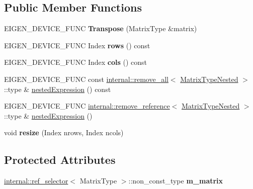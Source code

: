 \subsection*{Public Member Functions}
\begin{DoxyCompactItemize}
\item 
\mbox{\label{class_eigen_1_1_transpose_a5469f683c4bbcce2a40a2b43dad8a465}} 
E\+I\+G\+E\+N\+\_\+\+D\+E\+V\+I\+C\+E\+\_\+\+F\+U\+NC {\bfseries Transpose} (Matrix\+Type \&matrix)
\item 
\mbox{\label{class_eigen_1_1_transpose_a96ee3f0ac8d9d95671e5dda0e5e21356}} 
E\+I\+G\+E\+N\+\_\+\+D\+E\+V\+I\+C\+E\+\_\+\+F\+U\+NC Index {\bfseries rows} () const
\item 
\mbox{\label{class_eigen_1_1_transpose_a809b0d34821ca6ade698561f3495adca}} 
E\+I\+G\+E\+N\+\_\+\+D\+E\+V\+I\+C\+E\+\_\+\+F\+U\+NC Index {\bfseries cols} () const
\item 
E\+I\+G\+E\+N\+\_\+\+D\+E\+V\+I\+C\+E\+\_\+\+F\+U\+NC const \mbox{\hyperlink{struct_eigen_1_1internal_1_1remove__all}{internal\+::remove\+\_\+all}}$<$ \mbox{\hyperlink{struct_eigen_1_1internal_1_1true__type}{Matrix\+Type\+Nested}} $>$\+::type \& \mbox{\hyperlink{class_eigen_1_1_transpose_a72aefbf67f5e3caf62a99f73409b4a63}{nested\+Expression}} () const
\item 
E\+I\+G\+E\+N\+\_\+\+D\+E\+V\+I\+C\+E\+\_\+\+F\+U\+NC \mbox{\hyperlink{struct_eigen_1_1internal_1_1remove__reference}{internal\+::remove\+\_\+reference}}$<$ \mbox{\hyperlink{struct_eigen_1_1internal_1_1true__type}{Matrix\+Type\+Nested}} $>$\+::type \& \mbox{\hyperlink{class_eigen_1_1_transpose_a3265292cf912f401a32eea99975e47ea}{nested\+Expression}} ()
\item 
\mbox{\label{class_eigen_1_1_transpose_acdfe991ea04dd20939171780fef09818}} 
void {\bfseries resize} (Index nrows, Index ncols)
\end{DoxyCompactItemize}
\subsection*{Protected Attributes}
\begin{DoxyCompactItemize}
\item 
\mbox{\label{class_eigen_1_1_transpose_ad67b9a99f0c2859e56128159db5a749d}} 
\mbox{\hyperlink{struct_eigen_1_1internal_1_1ref__selector}{internal\+::ref\+\_\+selector}}$<$ Matrix\+Type $>$\+::non\+\_\+const\+\_\+type {\bfseries m\+\_\+matrix}
\end{DoxyCompactItemize}


